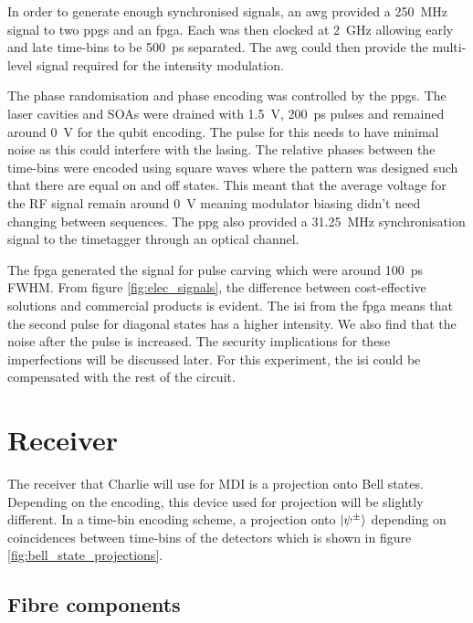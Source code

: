 
In order to generate enough synchronised signals, an \ac{awg} provided a \SI{250}{\MHz} signal to two \acp{ppg} and an \ac{fpga}. Each was then clocked at \SI{2}{GHz} allowing early and late time-bins to be \SI{500}{ps} separated. The \ac{awg} could then provide the multi-level signal required for the intensity modulation.

The phase randomisation and phase encoding was controlled by the \acp{ppg}. The laser cavities and \acp{SOA} were drained with \SI{1.5}{\V}, \SI{200}{ps} pulses and remained around \SI{0}{\V} for the qubit encoding. The pulse for this needs to have minimal noise as this could interfere with the lasing. The relative phases between the time-bins were encoded using square waves where the pattern was designed such that there are equal on and off states. This meant that the average voltage for the RF signal remain around \SI{0}{\V} meaning modulator biasing didn't need changing between sequences. The \ac{ppg} also provided a \SI{31.25}{MHz} synchronisation signal to the timetagger through an optical channel. 

The \ac{fpga} generated the signal for pulse carving which were around \SI{100}{ps} \ac{FWHM}. From figure \ref{fig:elec_signals}, the difference between cost-effective solutions and commercial products is evident. The \ac{isi} from the \ac{fpga} means that the second pulse for diagonal states has a higher intensity. We also find that the noise after the pulse is increased. The security implications for these imperfections will be discussed later. For this experiment, the \ac{isi} could be compensated with the rest of the circuit.  

\section{Receiver}

The receiver that Charlie will use for \ac{MDI} is a projection onto Bell states. Depending on the encoding, this device used for projection will be slightly different. In a time-bin encoding scheme, a projection onto $\ket{\psi^\pm}$ depending on coincidences between time-bins of the detectors which is shown in figure \ref{fig:bell_state_projections}.

\subsection{Fibre components}

